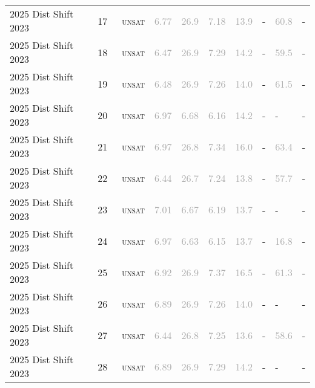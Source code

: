 \begin{center}
{\begin{longtable}{@{}llllllllll@{}}
2025 Dist Shift 2023 & 17 & ~\textsc{unsat} & \textcolor{darkgray}{6.77} & \textcolor{darkgray}{26.9} & \textcolor{darkgray}{7.18} & \textcolor{darkgray}{13.9} & - & \textcolor{darkgray}{60.8} & - \\
2025 Dist Shift 2023 & 18 & ~\textsc{unsat} & \textcolor{darkgray}{6.47} & \textcolor{darkgray}{26.9} & \textcolor{darkgray}{7.29} & \textcolor{darkgray}{14.2} & - & \textcolor{darkgray}{59.5} & - \\
2025 Dist Shift 2023 & 19 & ~\textsc{unsat} & \textcolor{darkgray}{6.48} & \textcolor{darkgray}{26.9} & \textcolor{darkgray}{7.26} & \textcolor{darkgray}{14.0} & - & \textcolor{darkgray}{61.5} & - \\
2025 Dist Shift 2023 & 20 & ~\textsc{unsat} & \textcolor{darkgray}{6.97} & \textcolor{darkgray}{6.68} & \textcolor{darkgray}{6.16} & \textcolor{darkgray}{14.2} & - & - & - \\
2025 Dist Shift 2023 & 21 & ~\textsc{unsat} & \textcolor{darkgray}{6.97} & \textcolor{darkgray}{26.8} & \textcolor{darkgray}{7.34} & \textcolor{darkgray}{16.0} & - & \textcolor{darkgray}{63.4} & - \\
2025 Dist Shift 2023 & 22 & ~\textsc{unsat} & \textcolor{darkgray}{6.44} & \textcolor{darkgray}{26.7} & \textcolor{darkgray}{7.24} & \textcolor{darkgray}{13.8} & - & \textcolor{darkgray}{57.7} & - \\
2025 Dist Shift 2023 & 23 & ~\textsc{unsat} & \textcolor{darkgray}{7.01} & \textcolor{darkgray}{6.67} & \textcolor{darkgray}{6.19} & \textcolor{darkgray}{13.7} & - & - & - \\
2025 Dist Shift 2023 & 24 & ~\textsc{unsat} & \textcolor{darkgray}{6.97} & \textcolor{darkgray}{6.63} & \textcolor{darkgray}{6.15} & \textcolor{darkgray}{13.7} & - & \textcolor{darkgray}{16.8} & - \\
2025 Dist Shift 2023 & 25 & ~\textsc{unsat} & \textcolor{darkgray}{6.92} & \textcolor{darkgray}{26.9} & \textcolor{darkgray}{7.37} & \textcolor{darkgray}{16.5} & - & \textcolor{darkgray}{61.3} & - \\
2025 Dist Shift 2023 & 26 & ~\textsc{unsat} & \textcolor{darkgray}{6.89} & \textcolor{darkgray}{26.9} & \textcolor{darkgray}{7.26} & \textcolor{darkgray}{14.0} & - & - & - \\
2025 Dist Shift 2023 & 27 & ~\textsc{unsat} & \textcolor{darkgray}{6.44} & \textcolor{darkgray}{26.8} & \textcolor{darkgray}{7.25} & \textcolor{darkgray}{13.6} & - & \textcolor{darkgray}{58.6} & - \\
2025 Dist Shift 2023 & 28 & ~\textsc{unsat} & \textcolor{darkgray}{6.89} & \textcolor{darkgray}{26.9} & \textcolor{darkgray}{7.29} & \textcolor{darkgray}{14.2} & - & - & - \\

\end{longtable}}
\end{center}
